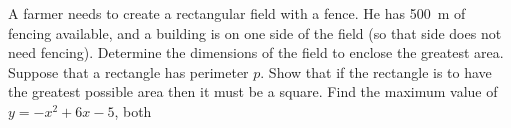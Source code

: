 \begin{questions}
  \question A farmer needs to create a rectangular field with a fence. He has \SI{500}{\metre} of fencing available, and a building
            is on one side of the field (so that side does not need fencing). Determine the dimensions of the field to enclose the
            greatest area.
  \question Suppose that a rectangle has perimeter $ p $. Show that if the rectangle is to have the greatest possible area then it
            must be a square.
  \question Find the maximum value of $ y = -x^2 + 6x - 5 $, both
\end{questions}
